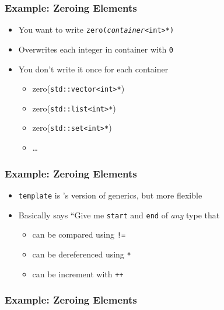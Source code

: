 \begin{frame}
  \frametitle{Example: Zeroing Elements}
  \begin{itemize}
    \item You want to write \texttt{zero({\itshape container}<int>*)}
    \item Overwrites each integer in container with \texttt{0}
    \item You don't write it once for each container
          \begin{itemize}
            \item zero(\texttt{std::vector<int>*})
            \item zero(\texttt{std::list<int>*})
            \item zero(\texttt{std::set<int>*})
            \item \dots
          \end{itemize}
  \end{itemize}
\end{frame}

\begin{frame}
  \frametitle{Example: Zeroing Elements}
  \begin{itemize}
    \item \texttt{template} is \cpp's version of generics, but more flexible
    \item Basically says ``Give me \texttt{start} and \texttt{end} of \emph{any} type that
          \begin{itemize}
            \item can be compared using \texttt{!=}
            \item can be dereferenced using \texttt{*}
            \item can be increment with \texttt{++}
          \end{itemize}
  \end{itemize}
\end{frame}

\begin{frame}
  \frametitle{Example: Zeroing Elements}
\end{frame}

